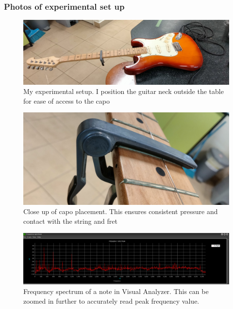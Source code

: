 \documentclass[11pt]{article}
\begin{document}
\begin{flushleft}
            \subsubsection*{Photos of experimental set up}
                \FloatBarrier
                \begin{figure}[!htb]
                    \includegraphics[width = \textwidth]{ee/experiment_setup.jpg}
                    \caption{My experimental setup. I position the guitar neck outside the table for ease of access to the capo} \label{fig5}
                \end{figure}
                \begin{figure}[!htb]
                    \includegraphics[angle=270, width = \textwidth]{ee/capo_on_fret.jpg}
                    \caption{Close up of capo placement. This ensures consistent pressure and contact with the string and fret} \label{fig6}
                \end{figure}
                \begin{figure}[!htb]
                    \includegraphics[width = \textwidth]{freq.png}
                    \caption{Frequency spectrum of a note in Visual Analyzer. This can be zoomed in further to accurately read peak frequency value.} \label{fig7}
                \end{figure}
        \FloatBarrier

\end{flushleft}
\end{document}
